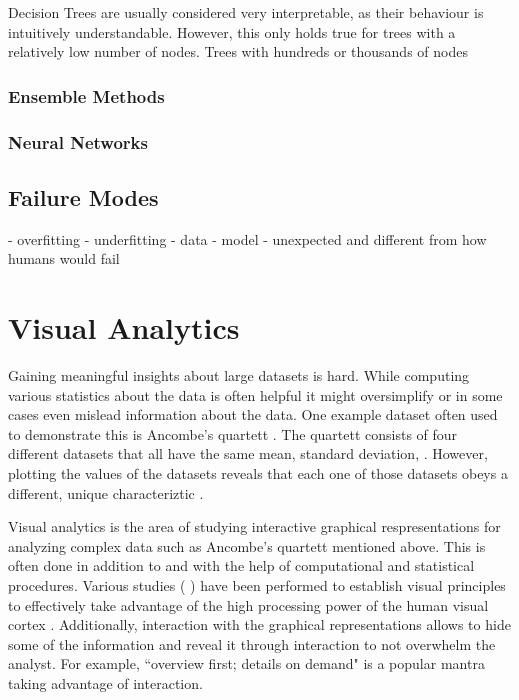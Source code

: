 Decision Trees are usually considered very interpretable, as their behaviour is intuitively understandable.
However, this only holds true for trees with a relatively low number of nodes.
Trees with hundreds or thousands of nodes 

\subsubsection{Ensemble Methods}

\subsubsection{Neural Networks}

\subsection{Failure Modes}
- overfitting
- underfitting
- data
- model
- unexpected and different from how humans would fail

\section{Visual Analytics}
Gaining meaningful insights about large datasets is hard.
While computing various statistics about the data is often helpful it might oversimplify or in some cases even mislead information about the data.
One example dataset often used to demonstrate this is Ancombe's quartett .
The quartett consists of four different datasets that all have the same mean, standard deviation, .
However, plotting the values of the datasets reveals that each one of those datasets obeys a different, unique characteriztic .

Visual analytics is the area of studying interactive graphical respresentations for analyzing complex data such as Ancombe's quartett mentioned above.
This is often done in addition to and with the help of computational and statistical procedures.
Various studies (
) have been performed to establish visual principles to effectively take advantage of the high processing power of the human visual cortex .
Additionally, interaction with the graphical representations allows to hide some of the information and reveal it through interaction to not overwhelm the analyst.
For example, ``overview first; details on demand"  is a popular mantra taking advantage of interaction.

